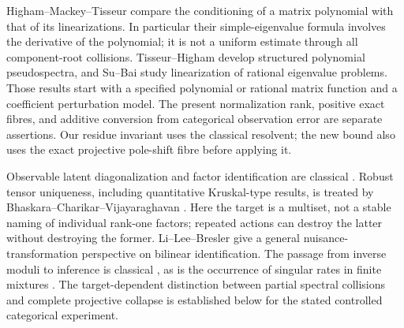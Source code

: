\documentclass[11pt,reqno]{amsart}
\numberwithin{equation}{section}
\theoremstyle{definition}\newtheorem{definition}[theorem]{Definition}
\theoremstyle{remark}\newtheorem{remark}[theorem]{Remark}
\begin{document}
Higham--Mackey--Tisseur \cite{HMT} compare the conditioning of a matrix
polynomial with that of its linearizations. In particular their
simple-eigenvalue formula involves the derivative of the polynomial;
it is not a uniform estimate through all component-root collisions.
Tisseur--Higham \cite{TH} develop structured polynomial pseudospectra,
and Su--Bai \cite{SB} study linearization of rational eigenvalue
problems. Those results start with a specified polynomial or rational
matrix function and a coefficient perturbation model. The present
normalization rank, positive exact fibres, and additive conversion
from categorical observation error are separate assertions. Our
residue invariant uses the classical resolvent; the new bound also
uses the exact projective pole-shift fibre before applying it.

Observable latent diagonalization and factor identification are
classical \cite{AMR,BJR}. Robust tensor uniqueness, including
quantitative Kruskal-type results, is treated by
Bhaskara--Charikar--Vijayaraghavan \cite{BCV}. Here the target is a
multiset, not a stable naming of individual rank-one factors; repeated
actions can destroy the latter without destroying the former.
Li--Lee--Bresler \cite{LLB} give a general nuisance-transformation
perspective on bilinear identification. The passage from inverse
moduli to inference is classical \cite{Donoho,CaiLow,Dufour}, as is
the occurrence of singular rates in finite mixtures \cite{HN}.
The target-dependent distinction between partial spectral collisions
and complete projective collapse is established below for the stated
controlled categorical experiment.







\end{document}

